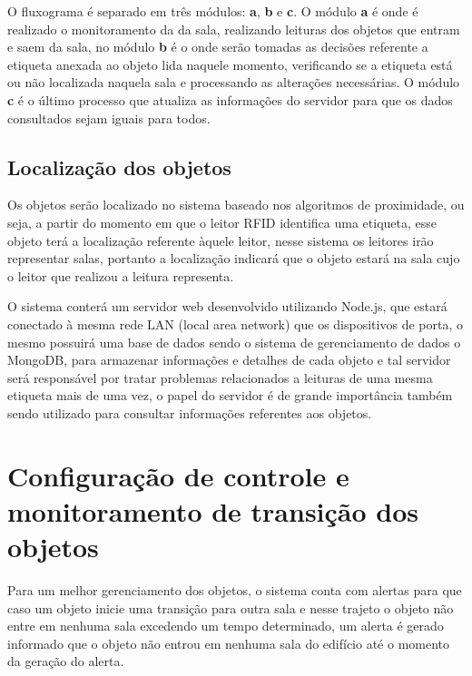 \par
O fluxograma é separado em três módulos: \textbf{a}, \textbf{b} e \textbf{c}. O módulo \textbf{a} é onde é realizado o
monitoramento da da sala, realizando leituras dos objetos que entram e saem da sala, no módulo \textbf{b} é o onde serão
tomadas as decisões referente a etiqueta anexada ao objeto lida naquele momento, verificando se a etiqueta está ou não
localizada naquela sala e processando as alterações necessárias. O módulo \textbf{c} é o último processo que atualiza as
informações do servidor para que os dados consultados sejam iguais para todos.


\subsection{Localização dos objetos}

Os objetos serão localizado no sistema baseado nos algoritmos de proximidade, ou seja, a partir do momento em que o leitor
RFID identifica uma etiqueta, esse objeto terá a localização referente àquele leitor, nesse sistema os leitores irão representar
salas, portanto a localização indicará que o objeto estará na sala cujo o leitor que realizou a leitura representa.

O sistema conterá um servidor web desenvolvido utilizando Node.js, que estará conectado à mesma rede LAN (local area network) que os dispositivos de porta, o mesmo possuirá uma base de dados sendo o sistema de gerenciamento de dados o MongoDB, para armazenar informações e detalhes de cada objeto e tal servidor será responsável por tratar problemas relacionados a leituras de uma mesma etiqueta mais de uma vez,
o papel do servidor é de grande importância também sendo utilizado para consultar informações referentes aos objetos.


\section{Configuração de controle e monitoramento de transição dos objetos}

Para um melhor gerenciamento dos objetos, o sistema conta com alertas para que caso um objeto inicie uma transição
para outra sala e nesse trajeto o objeto não entre em nenhuma sala excedendo um tempo determinado, um alerta é gerado
informado que o objeto não entrou em nenhuma sala do edifício até o momento da geração do alerta.

